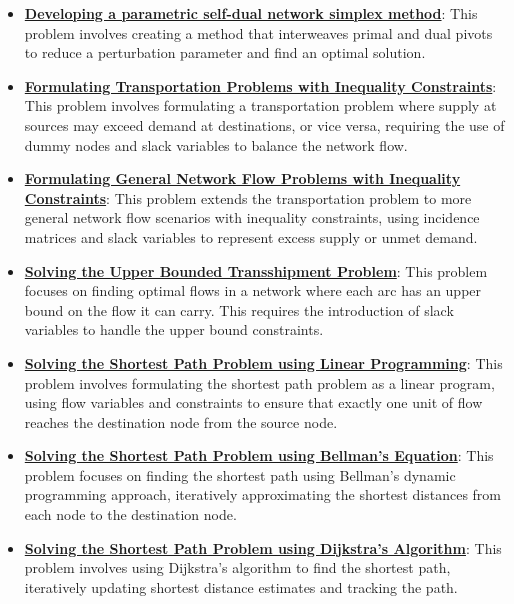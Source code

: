 \documentclass{article}%
\begin{document}
\begin{itemize}[leftmargin=*]
\item \href{https://www.math.purdue.edu/~yipn/421/2024-11-07-NetSimplex.pdf#page=45}{\textbf{Developing a parametric self-dual network simplex method}}: This problem involves creating a method that interweaves primal and dual pivots to reduce a perturbation parameter and find an optimal solution.%
\item \href{https://www.math.purdue.edu/~yipn/421/2024-11-14-NetAppls.pdf#page=2}{\textbf{Formulating Transportation Problems with Inequality Constraints}}: This problem involves formulating a transportation problem where supply at sources may exceed demand at destinations, or vice versa, requiring the use of dummy nodes and slack variables to balance the network flow.%
\item \href{https://www.math.purdue.edu/~yipn/421/2024-11-14-NetAppls.pdf#page=7}{\textbf{Formulating General Network Flow Problems with Inequality Constraints}}: This problem extends the transportation problem to more general network flow scenarios with inequality constraints, using incidence matrices and slack variables to represent excess supply or unmet demand.%
\item \href{https://www.math.purdue.edu/~yipn/421/2024-11-14-NetAppls.pdf#page=9}{\textbf{Solving the Upper Bounded Transshipment Problem}}: This problem focuses on finding optimal flows in a network where each arc has an upper bound on the flow it can carry. This requires the introduction of slack variables to handle the upper bound constraints.%
\item \href{https://www.math.purdue.edu/~yipn/421/2024-11-14-NetAppls.pdf#page=13}{\textbf{Solving the Shortest Path Problem using Linear Programming}}: This problem involves formulating the shortest path problem as a linear program, using flow variables and constraints to ensure that exactly one unit of flow reaches the destination node from the source node.%
\item \href{https://www.math.purdue.edu/~yipn/421/2024-11-14-NetAppls.pdf#page=16}{\textbf{Solving the Shortest Path Problem using Bellman's Equation}}: This problem focuses on finding the shortest path using Bellman's dynamic programming approach, iteratively approximating the shortest distances from each node to the destination node.%
\item \href{https://www.math.purdue.edu/~yipn/421/2024-11-14-NetAppls.pdf#page=20}{\textbf{Solving the Shortest Path Problem using Dijkstra's Algorithm}}: This problem involves using Dijkstra's algorithm to find the shortest path, iteratively updating shortest distance estimates and tracking the path.%

\end{itemize}
\end{document}
